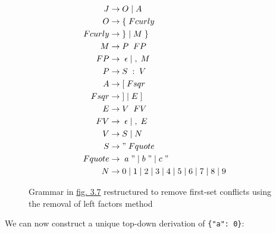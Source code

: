 \begin{figure}[H]
    \begin{center}
        \begin{equation}
            \begin{split}
                J &\rightarrow	O\;|\;A\\
                O &\rightarrow	\{\;Fcurly\\
                Fcurly &\rightarrow\;\}\;|\;M\;\}\\
                M &\rightarrow	P\;\;FP\\
                FP &\rightarrow\;\epsilon\;|\;,\;M\\
                P &\rightarrow	S\;:\;V\\
                A &\rightarrow	[\;Fsqr\\
                Fsqr &\rightarrow \;]\;|\;E\;]\\
                E &\rightarrow	V\;\;FV\\
                FV &\rightarrow\;\epsilon\;|\;,\;E\\
                V &\rightarrow	S\;|\;N\\
                S &\rightarrow	"\;Fquote\\
                Fquote &\rightarrow\;a\;"\;|\;b\;"\;|\;c\;"\\
                N &\rightarrow	0\;|\;1\;|\;2\;|\;3\;|\;4\;|\;5\;|\;6\;|\;7\;|\;8\;|\;9
            \end{split}
            \nonumber
        \end{equation}
    \end{center}
    \vspace{-1em}
    \caption{\label{fig:3.9}Grammar in \hyperref[fig:3.7]{fig. 3.7} restructured to remove first-set conflicts using the removal of left factors method}
\end{figure}

\pagebreak

We can now construct a unique top-down derivation of \verb|{"a": 0}|:

